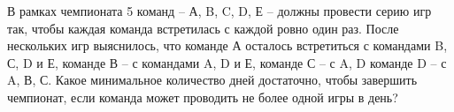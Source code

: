 \question
В рамках чемпионата 5 команд – А, B, C, D, Е – должны провести
серию игр так, чтобы каждая команда встретилась с каждой ровно один раз. После нескольких игр выяснилось, что команде А осталось встретиться с командами  B, С, D и Е, команде В – с командами  A, D и Е, команде С – с A, D команде D – с A, В, С. Какое минимальное количество дней достаточно, чтобы завершить чемпионат, если команда может проводить не более одной игры в день?
